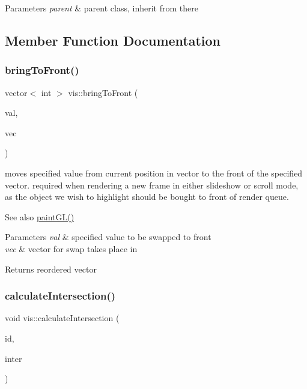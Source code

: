 \begin{DoxyParams}{Parameters}
{\em parent} & parent class, inherit from there \\
\hline
\end{DoxyParams}


\subsection{Member Function Documentation}
\mbox{\label{classvis_a2a60b45f440459d64a059a4e85b83957}} 
\subsubsection{\texorpdfstring{bring\+To\+Front()}{bringToFront()}}
{\footnotesize\ttfamily vector$<$ int $>$ vis\+::bring\+To\+Front (\begin{DoxyParamCaption}\item[{int}]{val,  }\item[{vector$<$ int $>$}]{vec }\end{DoxyParamCaption})}

moves specified value from current position in vector to the front of the specified vector. required when rendering a new frame in either slideshow or scroll mode, as the object we wish to highlight should be bought to front of render queue.

\begin{DoxySeeAlso}{See also}
\mbox{\hyperlink{classvis_ace835462bb98cad495e829c08e1a26ea}{paint\+G\+L()}} 
\end{DoxySeeAlso}

\begin{DoxyParams}{Parameters}
{\em val} & specified value to be swapped to front \\
\hline
{\em vec} & vector for swap takes place in \\
\hline
\end{DoxyParams}
\begin{DoxyReturn}{Returns}
reordered vector 
\end{DoxyReturn}
\mbox{\label{classvis_a8f646ff6bfeadb0ba8543377d46eb994}} 
\subsubsection{\texorpdfstring{calculate\+Intersection()}{calculateIntersection()}}
{\footnotesize\ttfamily void vis\+::calculate\+Intersection (\begin{DoxyParamCaption}\item[{int}]{id,  }\item[{vector$<$ \mbox{\hyperlink{structid_over_vec_len}{id\+Over\+Vec\+Len}} $>$}]{inter }\end{DoxyParamCaption})}

